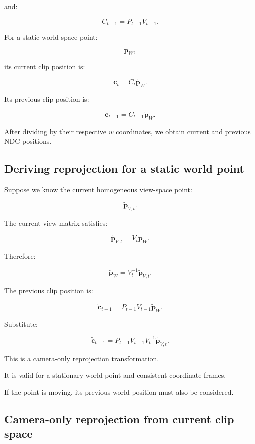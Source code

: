 and:

\[
 \boxed{ C_{t-1}=P_{t-1}V_{t-1} }.
\]

For a static world-space point:

\[
 \mathbf p_W,
\]

its current clip position is:

\[
 \boxed{ \mathbf c_t=C_t\tilde{\mathbf p}_W }.
\]

Its previous clip position is:

\[
 \boxed{ \mathbf c_{t-1}=C_{t-1}\tilde{\mathbf p}_W }.
\]

After dividing by their respective \(w\) coordinates, we obtain current and previous NDC positions.

\subsection{Deriving reprojection for a static world point}\label{02-foundations-ii-ch036-deriving-reprojection-for-a-static-world-point}

Suppose we know the current homogeneous view-space point:

\[
 \tilde{\mathbf p}_{V,t}.
\]

The current view matrix satisfies:

\[
 \tilde{\mathbf p}_{V,t} = V_t\tilde{\mathbf p}_W.
\]

Therefore:

\[
 \tilde{\mathbf p}_W= V_t^{-1}\tilde{\mathbf p}_{V,t}.
\]

The previous clip position is:

\[
 \tilde{\mathbf c}_{t-1} = P_{t-1}V_{t-1}\tilde{\mathbf p}_W.
\]

Substitute:

\[
 \boxed{ \tilde{\mathbf c}_{t-1} = P_{t-1}V_{t-1}V_t^{-1} \tilde{\mathbf p}_{V,t} }.
\]

This is a camera-only reprojection transformation.

It is valid for a stationary world point and consistent coordinate frames.

If the point is moving, its previous world position must also be considered.

\subsection{Camera-only reprojection from current clip space}\label{02-foundations-ii-ch036-camera-only-reprojection-from-current-clip-space}

